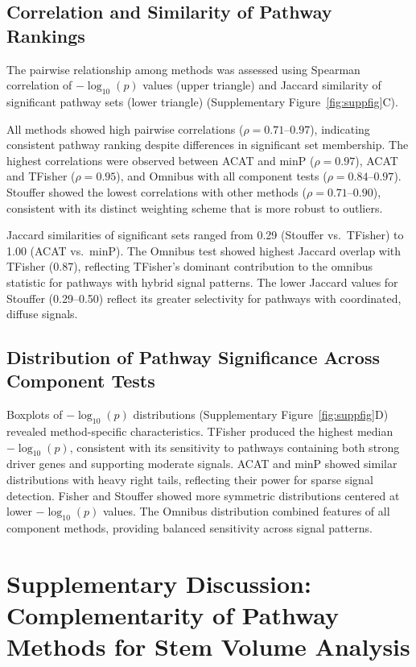 \documentclass[11pt]{article}
\begin{document}
\subsection{Correlation and Similarity of Pathway Rankings}

The pairwise relationship among methods was assessed using Spearman correlation of $-\log_{10}(p)$ values (upper triangle) and Jaccard similarity of significant pathway sets (lower triangle) (Supplementary Figure~\ref{fig:suppfig}C).

All methods showed high pairwise correlations ($\rho = 0.71$--$0.97$), indicating consistent pathway ranking despite differences in significant set membership. The highest correlations were observed between ACAT and minP ($\rho = 0.97$), ACAT and TFisher ($\rho = 0.95$), and Omnibus with all component tests ($\rho = 0.84$--$0.97$). Stouffer showed the lowest correlations with other methods ($\rho = 0.71$--$0.90$), consistent with its distinct weighting scheme that is more robust to outliers.

Jaccard similarities of significant sets ranged from 0.29 (Stouffer vs.\ TFisher) to 1.00 (ACAT vs.\ minP). The Omnibus test showed highest Jaccard overlap with TFisher (0.87), reflecting TFisher's dominant contribution to the omnibus statistic for pathways with hybrid signal patterns. The lower Jaccard values for Stouffer (0.29--0.50) reflect its greater selectivity for pathways with coordinated, diffuse signals.

\subsection{Distribution of Pathway Significance Across Component Tests}

Boxplots of $-\log_{10}(p)$ distributions (Supplementary Figure~\ref{fig:suppfig}D) revealed method-specific characteristics. TFisher produced the highest median $-\log_{10}(p)$, consistent with its sensitivity to pathways containing both strong driver genes and supporting moderate signals. ACAT and minP showed similar distributions with heavy right tails, reflecting their power for sparse signal detection. Fisher and Stouffer showed more symmetric distributions centered at lower $-\log_{10}(p)$ values. The Omnibus distribution combined features of all component methods, providing balanced sensitivity across signal patterns.

\section{Supplementary Discussion: Complementarity of Pathway Methods for Stem Volume Analysis}
\end{document}
